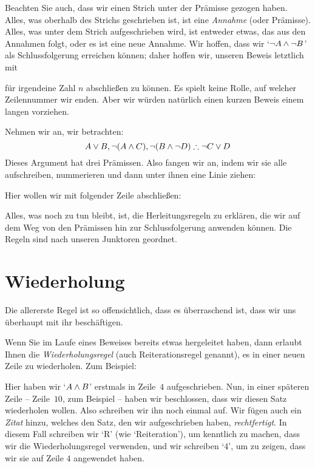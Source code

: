Beachten Sie auch, dass wir einen Strich unter der Prämisse gezogen haben. Alles, was oberhalb des Strichs geschrieben ist, ist eine \emph{Annahme} (oder Prämisse). Alles, was unter dem Strich aufgeschrieben wird, ist entweder etwas, das aus den Annahmen folgt, oder es ist eine neue Annahme. Wir hoffen, dass wir `$\neg A \wedge \neg B$' als Schlussfolgerung erreichen können; daher hoffen wir, unseren Beweis letztlich mit
\begin{fitchproof}
\end{fitchproof}
für irgendeine Zahl $n$ abschlie{\ss}en zu können. Es spielt keine Rolle, auf welcher Zeilennummer wir enden. Aber wir würden natürlich einen kurzen Beweis einem langen vorziehen.

Nehmen wir an, wir betrachten:
$$A\eor B, \enot (A\eand C), \enot (B \eand \enot D) \therefore \enot C\eor D$$
Dieses Argument hat drei Prämissen. Also fangen wir an, indem wir sie alle aufschreiben, nummerieren und dann unter ihnen eine Linie ziehen:
\begin{fitchproof}
\end{fitchproof}
Hier wollen wir mit folgender Zeile abschlie{\ss}en:
\begin{fitchproof}
\end{fitchproof}
Alles, was noch zu tun bleibt, ist, die Herleitungsregeln zu erklären, die wir auf dem Weg von den Prämissen hin zur Schlussfolgerung anwenden können. Die Regeln sind nach unseren Junktoren geordnet.

\section{Wiederholung}
Die allererste Regel ist so offensichtlich, dass es überraschend ist, dass wir uns überhaupt mit ihr beschäftigen. 

Wenn Sie im Laufe eines Beweises bereits etwas hergeleitet haben, dann erlaubt Ihnen die \emph{Wiederholungsregel} (auch Reiterationsregel genannt), es in einer neuen Zeile zu wiederholen. Zum Beispiel:
\begin{fitchproof}
	\have[$\vdots$]{}{\vdots}
	 
\end{fitchproof}
Hier haben wir `$A \wedge B$' erstmals in Zeile~$4$ aufgeschrieben. Nun, in einer späteren Zeile -- Zeile~$10$, zum Beispiel -- haben wir beschlossen, dass wir diesen Satz wiederholen wollen. Also schreiben wir ihn noch einmal auf. Wir fügen auch ein \emph{Zitat} hinzu, welches den Satz, den wir aufgeschrieben haben, \emph{rechtfertigt}. In diesem Fall schreiben wir `R' (wie `Reiteration'), um kenntlich zu machen, dass wir die Wiederholungsregel verwenden, und wir schreiben `$4$', um zu zeigen, dass wir sie auf Zeile $4$ angewendet haben.

